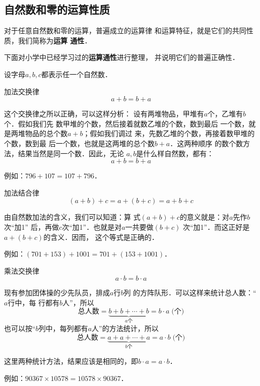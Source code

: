 \subsection{自然数和零的运算性质}
对于任意自然数和零的运算，普遍成立的运算律
和运算特征，就是它们的共同性质，我们简称为\textbf{运算
	通性}．

下面对小学中已经学习过的\textbf{运算通性}进行整理，
并说明它们的普遍正确性．

设字母$a,  b,  c$都表示任一个自然数．

\begin{blk}{加法交换律}
	\[a+b=b+a \]
\end{blk}
\begin{note}
	这个交换律之所以正确，可以这样分析：
	设有两堆物品，甲堆有$a$个，乙堆有$b$个．假如我们先
	数甲堆的个数，然后接着就数乙堆的个数，数到最后
	一个数，就是两堆物品的总个数$a+b$；假如我们调过
	来，先数乙堆的个数，再接着数甲堆的个数，数到最
	后一个数，也就是这两堆的总个数$b+a$．这两种顺序
	的数个数方法，结果当然是同一个数．因此，无论
	$a, b$是什么样自然数，都有：
	\[a+b=b+a \]
	
	例如：$796+107=107+796$．
\end{note}


\begin{blk}{加法结合律}
	\[(a+b)+c=a+(b+c)=a+b+c \]
\end{blk}
\begin{note}
	由自然数加法的含义，我们可以知道：算
	式$(a+b) +c$的意义就是：对$a$先作$b$次“加1”
	后，再做$c$次“加1”．也就是对$a$一共要做$(b+c)$
	次“加1”．而这正好是$a+ (b+c)$的含义．因而，
	这个等式是正确的．
	
	例如：$(701+153)+1001 =701+(153+1001)$．
\end{note}


\begin{blk}{乘法交换律}
	\[a\cdot b=b\cdot a \]
\end{blk}
\begin{note}
	现有参加团体操的少先队员，排成$a$行$b$列
	的方阵队形．可以这样来统计总人数：“$a$行中，每
	行都有$b$人”，所以
	\[\text{总人数}=\underbrace{b+b+\cdots+b}_{a\text{个}}=b\cdot a \; \text{(个)} \]
	也可以按“$b$列中，每列都有$a$人”的方法统计，所以
	\[\text{总人数}=\underbrace{a+a+\cdots+a}_{b\text{个}}=a\cdot b \; \text{(个)} \]
	
	这里两种统计方法，结果应该是相同的，即$b\cdot a=a\cdot b$．
	
	例如：$90367 \times  10578=10578 \times  90367$．
\end{note}



